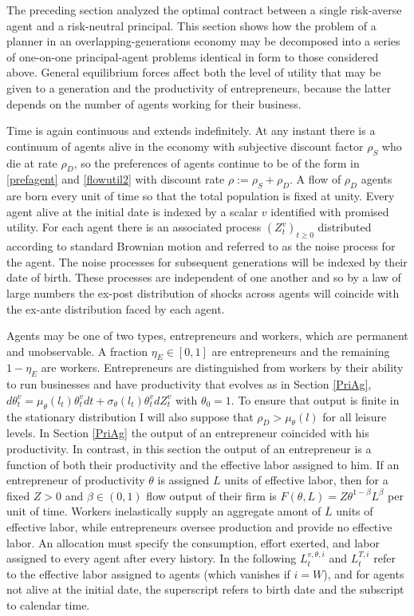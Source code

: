 \documentclass[11pt]{article}
\theoremstyle{plain}
\begin{document}
The preceding section analyzed the optimal contract between a single risk-averse agent and a risk-neutral principal. This section shows how the problem of a planner in an overlapping-generations economy may be decomposed into a series of one-on-one principal-agent problems identical in form to those considered above. General equilibrium forces affect both the level of utility that may be given to a generation and the productivity of entrepreneurs, because the latter depends on the number of agents working for their business. 


Time is again continuous and extends indefinitely. At any instant there is a continuum of agents alive in the economy with subjective discount factor $\rho_S$ who die at rate $\rho_D$, so the preferences of agents continue to be of the form in \eqref{prefagent} and \eqref{flowutil2} with discount rate $\rho := \rho_S+\rho_D$. A flow of $\rho_D$ agents are born every unit of time so that the total population is fixed at unity. Every agent alive at the initial date is indexed by a scalar $v$ identified with promised utility. For each agent there is an associated process $(Z^v_t)_{t\geq0}$ distributed according to standard Brownian motion and referred to as the noise process for the agent. The noise processes for subsequent generations will be indexed by their date of birth. These processes are independent of one another and so by a law of large numbers the ex-post distribution of shocks across agents will coincide with the ex-ante distribution faced by each agent. 

Agents may be one of two types, entrepreneurs and workers, which are permanent and unobservable. A fraction $\eta_E \in [0,1]$ are entrepreneurs and the remaining $1-\eta_E$ are workers. Entrepreneurs are distinguished from workers by their ability to run businesses and have productivity that evolves as in Section \ref{PriAg}, $d\theta^v_t = \mu_{\theta}(l_t)\theta^v_tdt + \sigma_{\theta}(l_t)\theta^v_t dZ^v_t$ with $\theta_0 = 1$. To ensure that output is finite in the stationary distribution I will also suppose that $\rho_D > \mu_{\theta}(l)$ for all leisure levels. In Section \ref{PriAg} the output of an entrepreneur coincided with his productivity. In contrast, in this section the output of an entrepreneur is a function of both their productivity and the effective labor assigned to him. If an entrepreneur of productivity $\theta$ is assigned $L$ units of effective labor, then for a fixed $Z>0$ and $\beta \in (0,1)$ flow output of their firm is $F(\theta,L) = Z\theta^{1-\beta}L^{\beta}$ per unit of time. Workers inelastically supply an aggregate amont of $\overline{L}$ units of effective labor, while entrepreneurs oversee production and provide no effective labor.  An allocation must specify the consumption, effort exerted, and labor assigned to every agent after every history. In the following $L^{v,\theta,i}_t$ and $L^{T,i}_t$ refer to the effective labor assigned to agents (which vanishes if $i=W$), and for agents not alive at the initial date, the superscript refers to birth date and the subscript to calendar time.
\end{document}

